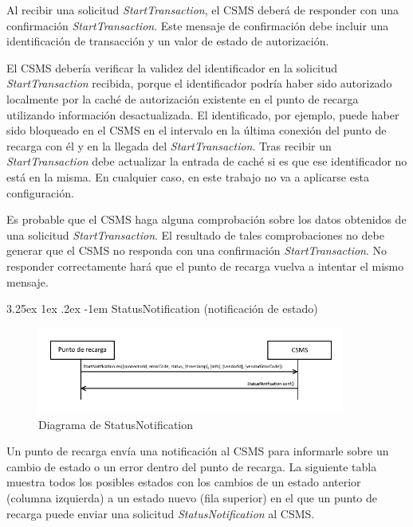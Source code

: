 \documentclass[12pt,a4paper,onecolumn,oneside]{report}
\makeatletter
\renewcommand\paragraph{\@startsection{paragraph}{5}{\z@}%
  {3.25ex \@plus1ex \@minus.2ex}%
  {-1em}%
  {\normalfont\normalsize\bfseries}}
\makeatother
\begin{document}
Al recibir una solicitud \textit{StartTransaction}, el CSMS deberá de responder con una confirmación \textit{StartTransaction}. Este mensaje de confirmación debe incluir una identificación de transacción y un valor de estado de autorización.

El CSMS debería verificar la validez del identificador en la solicitud \textit{StartTransaction} recibida, porque el identificador podría haber sido autorizado localmente por la caché de autorización existente en el punto de recarga utilizando información desactualizada. El identificado, por ejemplo, puede haber sido bloqueado en el CSMS en el intervalo en la última conexión del punto de recarga con él y en la llegada del \textit{StartTransaction}. Tras recibir un \textit{StartTransaction} debe actualizar la entrada de caché si es que ese identificador no está en la misma. En cualquier caso, en este trabajo no va a aplicarse esta configuración.

Es probable que el CSMS haga alguna comprobación sobre los datos obtenidos de una solicitud \textit{StartTransaction}. El resultado de tales comprobaciones no debe generar que el CSMS no responda con una confirmación \textit{StartTransaction}. No responder correctamente hará que el punto de recarga vuelva a intentar el mismo mensaje.


\paragraph{StatusNotification (notificación de estado)}
\label{StatusNotification (notificación de estado)}


\begin{figure}[H] 
\centering
  \includegraphics[width=0.9\textwidth]{figuras/diagramastatusnotification.png}
  \caption[Diagrama de \textit{StatusNotification}]{Diagrama de StatusNotification\\
  }
  \label{fig:diagramastatusnotification}
\end{figure}



Un punto de recarga envía una notificación al CSMS para informarle sobre un cambio de estado o un error dentro del punto de recarga. La siguiente tabla muestra todos los posibles estados con los cambios de un estado anterior (columna izquierda) a un estado nuevo (fila superior) en el que un punto de recarga puede enviar una solicitud \textit{StatusNotification} al CSMS.
\end{document}
